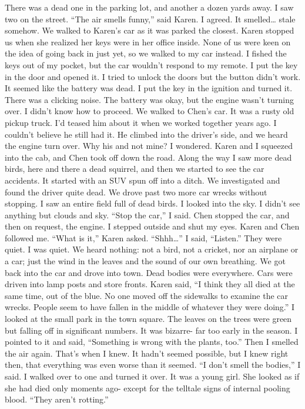 \documentclass[a4paper]{article}
\begin{document}
There was a dead one in the parking lot, and another a dozen yards away. I saw two on the street.
“The air smells funny,” said Karen. I agreed. It smelled… stale somehow.
We walked to Karen’s car as it was parked the closest. Karen stopped us when she realized her keys were in her office inside. None of us were keen on the idea of going back in just yet, so we walked to my car instead.
I fished the keys out of my pocket, but the car wouldn’t respond to my remote. I put the key in the door and opened it. I tried to unlock the doors but the button didn’t work. It seemed like the battery was dead. I put the key in the ignition and turned it. There was a clicking noise. The battery was okay, but the engine wasn't turning over. I didn't know how to proceed.
We walked to Chen’s car. It was a rusty old pickup truck. I’d teased him about it when we worked together years ago. I couldn’t believe he still had it. He climbed into the driver’s side, and we heard the engine turn over. Why his and not mine? I wondered.
Karen and I squeezed into the cab, and Chen took off down the road. Along the way I saw more dead birds, here and there a dead squirrel, and then we started to see the car accidents. It started with an SUV spun off into a ditch. We investigated and found the driver quite dead.
We drove past two more car wrecks without stopping. I saw an entire field full of dead birds. I looked into the sky. I didn’t see anything but clouds and sky. “Stop the car,” I said.
Chen stopped the car, and then on request, the engine. I stepped outside and shut my eyes. Karen and Chen followed me. “What is it,” Karen asked.
“Shhh…” I said, “Listen.”
They were quiet. I was quiet. We heard nothing: not a bird, not a cricket, nor an airplane or a car; just the wind in the leaves and the sound of our own breathing.
We got back into the car and drove into town. Dead bodies were everywhere. Cars were driven into lamp posts and store fronts.
Karen said, “I think they all died at the same time, out of the blue. No one moved off the sidewalks to examine the car wrecks. People seem to have fallen in the middle of whatever they were doing.”
I looked at the small park in the town square. The leaves on the trees were green but falling off in significant numbers. It was bizarre- far too early in the season. I pointed to it and said, “Something is wrong with the plants, too.”
Then I smelled the air again. That’s when I knew. It hadn’t seemed possible, but I knew right then, that everything was even worse than it seemed.
“I don’t smell the bodies,” I said. I walked over to one and turned it over. It was a young girl. She looked as if she had died only moments ago- except for the telltale signs of internal pooling blood. “They aren't rotting.”
\end{document}
